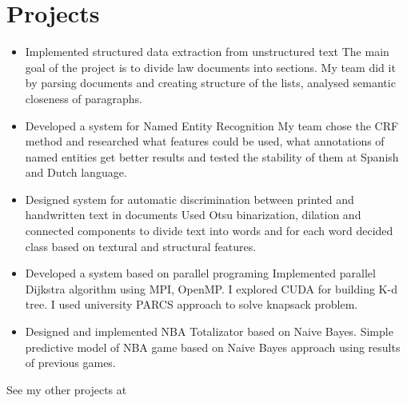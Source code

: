 \documentclass[letterpaper]{twentysecondcv} %
\begin{document}
\section{Projects}
\begin{itemize}
    \item \projectItem
        {Implemented structured data extraction from unstructured text }
        {The main goal of the project is to divide law documents into sections. My team did it by parsing documents and creating structure of the lists, analysed semantic closeness of paragraphs.}

	\item \projectItem
        {Developed a system for Named Entity Recognition}
        {My team chose the CRF method and researched what features could be used, what annotations of named entities get better results and tested the stability of them at Spanish and Dutch language.}

    \item \projectItem
        {Designed system for automatic discrimination between printed and handwritten text in documents}
        {Used Otsu binarization, dilation and connected components to divide text into words and for each word decided class based on textural and structural features.}
	\item \projectItem
        {Developed a system based on parallel programing}
        {Implemented parallel Dijkstra algorithm using MPI, OpenMP. I explored CUDA for building K-d tree. I used university PARCS approach to solve knapsack problem.}
	\item \projectItem
        {Designed and implemented NBA Totalizator based on Naive Bayes.}
        {Simple predictive model of NBA game based on Naive Bayes approach using results of previous games.}
\end{itemize}
\projectItem
    {See my other projects at  }
    {}
\end{document}
